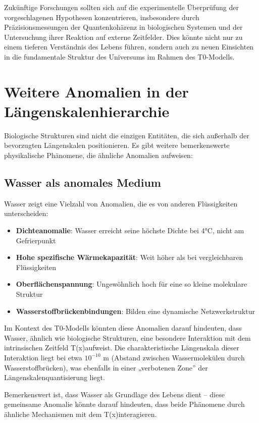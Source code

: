 \documentclass[12pt,a4paper]{article}
\newcommand{\Tfield}{T(x)}
\begin{document}
	Zukünftige Forschungen sollten sich auf die experimentelle Überprüfung der vorgeschlagenen Hypothesen konzentrieren, insbesondere durch Präzisionsmessungen der Quantenkohärenz in biologischen Systemen und der Untersuchung ihrer Reaktion auf externe Zeitfelder. Dies könnte nicht nur zu einem tieferen Verständnis des Lebens führen, sondern auch zu neuen Einsichten in die fundamentale Struktur des Universums im Rahmen des T0-Modells.
	
	\section{Weitere Anomalien in der Längenskalenhierarchie}
	
	Biologische Strukturen sind nicht die einzigen Entitäten, die sich außerhalb der bevorzugten Längenskalen positionieren. Es gibt weitere bemerkenswerte physikalische Phänomene, die ähnliche Anomalien aufweisen:
	
	\subsection{Wasser als anomales Medium}
	
	Wasser zeigt eine Vielzahl von Anomalien, die es von anderen Flüssigkeiten unterscheiden:
	
	\begin{itemize}
		\item \textbf{Dichteanomalie}: Wasser erreicht seine höchste Dichte bei 4°C, nicht am Gefrierpunkt
		\item \textbf{Hohe spezifische Wärmekapazität}: Weit höher als bei vergleichbaren Flüssigkeiten
		\item \textbf{Oberflächenspannung}: Ungewöhnlich hoch für eine so kleine molekulare Struktur
		\item \textbf{Wasserstoffbrückenbindungen}: Bilden eine dynamische Netzwerkstruktur
	\end{itemize}
	
	Im Kontext des T0-Modells könnten diese Anomalien darauf hindeuten, dass Wasser, ähnlich wie biologische Strukturen, eine besondere Interaktion mit dem intrinsischen Zeitfeld \Tfield aufweist. Die charakteristische Längenskala dieser Interaktion liegt bei etwa $10^{-10}$ m (Abstand zwischen Wassermolekülen durch Wasserstoffbrücken), was ebenfalls in einer „verbotenen Zone'' der Längenskalenquantisierung liegt.
	
	Bemerkenswert ist, dass Wasser als Grundlage des Lebens dient – diese gemeinsame Anomalie könnte darauf hindeuten, dass beide Phänomene durch ähnliche Mechanismen mit dem \Tfield interagieren.
	
\end{document}
